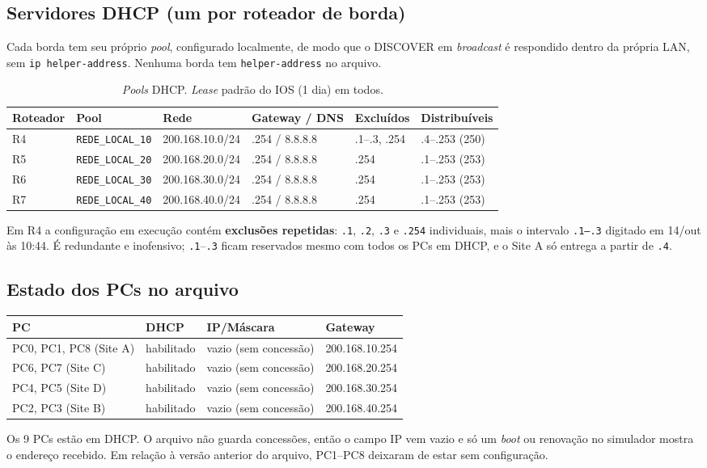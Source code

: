 \documentclass[12pt,a4paper]{article}
\begin{document}
\subsection{Servidores DHCP (um por roteador de borda)}
Cada borda tem seu próprio \textit{pool}, configurado localmente, de modo que o DISCOVER em \textit{broadcast} é respondido dentro da própria LAN, sem \texttt{ip helper-address}. Nenhuma borda tem \texttt{helper-address} no arquivo.
\begin{table}[H]\centering\small
\begin{tabular}{@{}llllll@{}}\toprule
Roteador & Pool & Rede & Gateway / DNS & Excluídos & Distribuíveis\\\midrule
R4 & \texttt{REDE\_LOCAL\_10} & 200.168.10.0/24 & .254 / 8.8.8.8 & .1--.3, .254 & .4--.253 (250)\\
R5 & \texttt{REDE\_LOCAL\_20} & 200.168.20.0/24 & .254 / 8.8.8.8 & .254 & .1--.253 (253)\\
R6 & \texttt{REDE\_LOCAL\_30} & 200.168.30.0/24 & .254 / 8.8.8.8 & .254 & .1--.253 (253)\\
R7 & \texttt{REDE\_LOCAL\_40} & 200.168.40.0/24 & .254 / 8.8.8.8 & .254 & .1--.253 (253)\\ \bottomrule
\end{tabular}
\caption{\textit{Pools} DHCP. \textit{Lease} padrão do IOS (1 dia) em todos.}
\end{table}
Em R4 a configuração em execução contém \textbf{exclusões repetidas}: \texttt{.1}, \texttt{.2}, \texttt{.3} e \texttt{.254} individuais, mais o intervalo \texttt{.1--.3} digitado em 14/out às 10:44. É redundante e inofensivo; \texttt{.1}--\texttt{.3} ficam reservados mesmo com todos os PCs em DHCP, e o Site A só entrega a partir de \texttt{.4}.

\subsection{Estado dos PCs no arquivo}
\begin{table}[H]\centering\small
\begin{tabular}{@{}llll@{}}\toprule
PC & DHCP & IP/Máscara & Gateway\\\midrule
PC0, PC1, PC8 (Site A) & habilitado & vazio (sem concessão) & 200.168.10.254\\
PC6, PC7 (Site C) & habilitado & vazio (sem concessão) & 200.168.20.254\\
PC4, PC5 (Site D) & habilitado & vazio (sem concessão) & 200.168.30.254\\
PC2, PC3 (Site B) & habilitado & vazio (sem concessão) & 200.168.40.254\\\bottomrule
\end{tabular}
\end{table}
Os 9 PCs estão em DHCP. O arquivo não guarda concessões, então o campo IP vem vazio e só um \textit{boot} ou renovação no simulador mostra o endereço recebido. Em relação à versão anterior do arquivo, PC1--PC8 deixaram de estar sem configuração.
\end{document}
